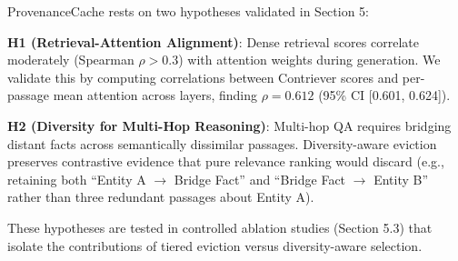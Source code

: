 ProvenanceCache rests on two hypotheses validated in Section 5:

\textbf{H1 (Retrieval-Attention Alignment)}: Dense retrieval scores correlate moderately (Spearman $\rho > 0.3$) with attention weights during generation. We validate this by computing correlations between Contriever scores and per-passage mean attention across layers, finding $\rho = 0.612$ (95\% CI [0.601, 0.624]).

\textbf{H2 (Diversity for Multi-Hop Reasoning)}: Multi-hop QA requires bridging distant facts across semantically dissimilar passages. Diversity-aware eviction preserves contrastive evidence that pure relevance ranking would discard (e.g., retaining both ``Entity A $\rightarrow$ Bridge Fact'' and ``Bridge Fact $\rightarrow$ Entity B'' rather than three redundant passages about Entity A).

These hypotheses are tested in controlled ablation studies (Section 5.3) that isolate the contributions of tiered eviction versus diversity-aware selection.

